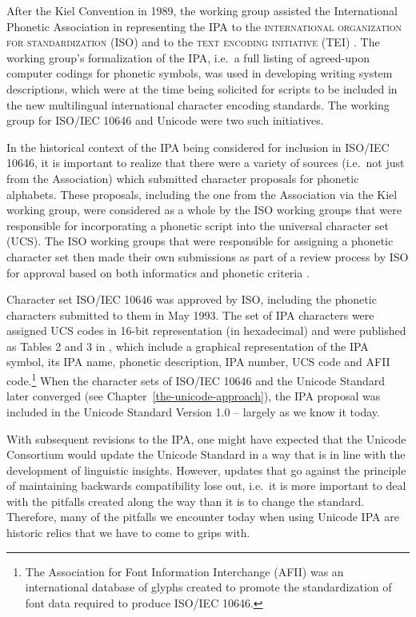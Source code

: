 After the Kiel Convention in 1989, the working group assisted
the International Phonetic Association in representing the IPA to the
\textsc{international organization for standardization} (ISO) and to the \textsc{text
encoding initiative} (TEI) \citep{EslingGaylord1993}. The working group's
formalization of the IPA, i.e.\ a full listing of agreed-upon computer codings
for phonetic symbols, was used in developing writing system descriptions, which
were at the time being solicited for scripts to be included in the new
multilingual international character encoding standards. The working group for
ISO/IEC 10646 and Unicode were two such initiatives.

In the historical context of the IPA being considered for inclusion in 
ISO/IEC 10646, it is important to realize that there were a variety of 
sources (i.e.\ not just from the Association) which submitted character 
proposals for phonetic alphabets. These proposals, including the one from the 
Association via the Kiel working group, were considered as a whole by 
the ISO working groups that were responsible for incorporating a phonetic 
script into the universal character set (UCS). The ISO working groups that 
were responsible for assigning a phonetic character set then made their 
own submissions as part of a review process by ISO for approval based on 
both informatics and phonetic criteria \citep[86]{EslingGaylord1993}. 

Character set ISO/IEC 10646 was approved by ISO, including the phonetic
characters submitted to them in May 1993. The set of IPA characters were
assigned UCS codes in 16-bit representation (in hexadecimal) and were published
as Tables 2 and 3 in \cite{EslingGaylord1993}, which include a graphical
representation of the IPA symbol, its IPA name, phonetic description, IPA
number, UCS code and AFII code.\footnote{The Association for Font
Information Interchange (AFII) was an international database of glyphs created
to promote the standardization of font data required to produce ISO/IEC 10646.} When the
character sets of ISO/IEC 10646 and the Unicode Standard later converged (see
Chapter~\ref{the-unicode-approach}), the IPA proposal was
included in the Unicode Standard Version 1.0 -- largely as we know it
today.

With subsequent revisions to the IPA, one might have expected that the Unicode
Consortium would update the Unicode Standard in a way that is in line with the
development of linguistic insights. However, updates that go against the principle
of maintaining backwards compatibility lose out, i.e.\ it is more important to
deal with the pitfalls created along the way than it is to change the standard.
Therefore, many of the pitfalls we encounter today when using Unicode IPA are
historic relics that we have to come to grips with.

